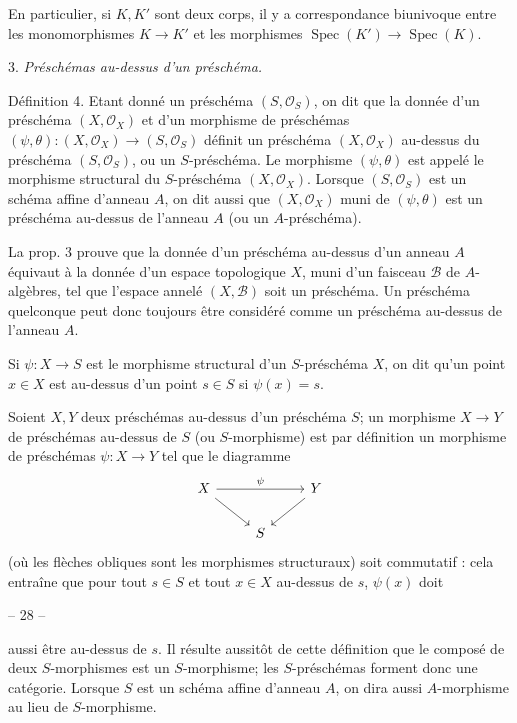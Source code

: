 En particulier, si $K, K'$ sont deux corps, il y a correspondance biunivoque entre les monomorphismes $K \to K'$ et les morphismes $\operatorname{Spec}(K') \to \operatorname{Spec}(K)$.

3. \emph{Préschémas au-dessus d'un préschéma.}

Définition 4. Etant donné un préschéma $(S, \mathcal{O}_S)$, on dit que la donnée d'un préschéma $(X, \mathcal{O}_X)$ et d'un morphisme de préschémas $(\psi, \theta): (X, \mathcal{O}_X) \to (S, \mathcal{O}_S)$ définit un préschéma $(X, \mathcal{O}_X)$ au-dessus du préschéma $(S, \mathcal{O}_S)$, ou un $S$-préschéma. Le morphisme $(\psi, \theta)$ est appelé le morphisme structural du $S$-préschéma $(X, \mathcal{O}_X)$. Lorsque $(S, \mathcal{O}_S)$ est un schéma affine d'anneau $A$, on dit aussi que $(X, \mathcal{O}_X)$ muni de $(\psi, \theta)$ est un préschéma au-dessus de l'anneau $A$ (ou un $A$-préschéma).

La prop. 3 prouve que la donnée d'un préschéma au-dessus d'un anneau $A$ équivaut à la donnée d'un espace topologique $X$, muni d'un faisceau $\mathcal{B}$ de $A$-algèbres, tel que l'espace annelé $(X, \mathcal{B})$ soit un préschéma. Un préschéma quelconque peut donc toujours être considéré comme un préschéma au-dessus de l'anneau $A$.

Si $\psi: X \to S$ est le morphisme structural d'un $S$-préschéma $X$, on dit qu'un point $x \in X$ est au-dessus d'un point $s \in S$ si $\psi(x) = s$.

Soient $X, Y$ deux préschémas au-dessus d'un préschéma $S$; un morphisme $X \to Y$ de préschémas au-dessus de $S$ (ou $S$-morphisme) est par définition un morphisme de préschémas $\psi: X \to Y$ tel que le diagramme
$$\begin{tikzcd}
X \arrow[rr, "\psi"] \arrow[dr] & & Y \arrow[dl] \\
& S &
\end{tikzcd}$$
(où les flèches obliques sont les morphismes structuraux) soit commutatif : cela entraîne que pour tout $s \in S$ et tout $x \in X$ au-dessus de $s$, $\psi(x)$ doit

\newpage


\noindent -- 28 --

\noindent aussi être au-dessus de $s$. Il résulte aussitôt de cette définition que le composé de deux $S$-morphismes est un $S$-morphisme; les $S$-préschémas forment donc une catégorie. Lorsque $S$ est un schéma affine d'anneau $A$, on dira aussi $A$-morphisme au lieu de $S$-morphisme.

